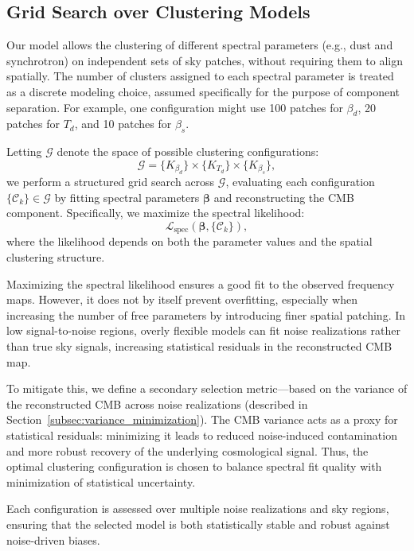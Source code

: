 \documentclass[fleqn,usenatbib]{mnras}
\begin{document}
\subsection{Grid Search over Clustering Models}
\label{subsec:grid_search}

Our model allows the clustering of different spectral parameters (e.g., dust and synchrotron) on independent sets of sky patches, without requiring them to align spatially. The number of clusters assigned to each spectral parameter is treated as a discrete modeling choice, assumed specifically for the purpose of component separation. For example, one configuration might use 100 patches for \( \beta_d \), 20 patches for \( T_d \), and 10 patches for \( \beta_s \).

Letting \( \mathcal{G} \) denote the space of possible clustering configurations:
\[
\mathcal{G} = \{K_{\beta_d} \} \times \{ K_{T_d} \} \times \{ K_{\beta_s} \},
\]
we perform a structured grid search across \( \mathcal{G} \), evaluating each configuration \( \{ \mathcal{C}_k \} \in \mathcal{G} \) by fitting spectral parameters \( \boldsymbol{\beta} \) and reconstructing the CMB component. Specifically, we maximize the spectral likelihood:
\[
\mathcal{L}_{\text{spec}}(\boldsymbol{\beta}, \{ \mathcal{C}_k \}),
\]
where the likelihood depends on both the parameter values and the spatial clustering structure.

Maximizing the spectral likelihood ensures a good fit to the observed frequency maps. However, it does not by itself prevent overfitting, especially when increasing the number of free parameters by introducing finer spatial patching. In low signal-to-noise regions, overly flexible models can fit noise realizations rather than true sky signals, increasing statistical residuals in the reconstructed CMB map.

To mitigate this, we define a secondary selection metric—based on the variance of the reconstructed CMB across noise realizations (described in Section~\ref{subsec:variance_minimization}). The CMB variance acts as a proxy for statistical residuals: minimizing it leads to reduced noise-induced contamination and more robust recovery of the underlying cosmological signal. Thus, the optimal clustering configuration is chosen to balance spectral fit quality with minimization of statistical uncertainty.

Each configuration is assessed over multiple noise realizations and sky regions, ensuring that the selected model is both statistically stable and robust against noise-driven biases.
\end{document}
